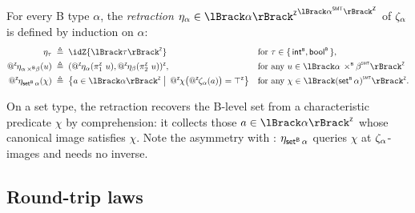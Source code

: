 \begin{definition}
  \label{def:beer-retraction}
  For every B type \(\alpha\), the \emph{retraction} \(\regnotation{\retr{\alpha}} \in {\interpZ{\alpha}}^{\interpZ{\toSMT{\alpha}}}\) of \(\zeta_{\alpha}\) is defined by induction on \(\alpha\):
  \begin{align*}
    \retr{\tau} &\;\triangleq\; \idZ{\interpZ{\tau}} && \text{for \(\tau \in \{\,\intB, \boolB\,\}\)}, \\
    \appZ\retr{\alpha \prodB \beta}(u) &\;\triangleq\; \pairZ{\appZ\retr{\alpha}(\fstZ u)}{\appZ\retr{\beta}(\sndZ u)}, && \text{for any \(u \in \interpZ{\toSMT{\alpha \prodB \beta}}\)} \\
    \appZ\retr{\setB \alpha}(\chi) &\;\triangleq\; \bigl\{ a \in \interpZ{\alpha} \;\big|\; \appZ \chi\bigl(\appZ\canon{\alpha}(a)\bigr) = \topZ \bigr\} && \text{for any \(\chi \in \interpZ{\toSMT{(\setB\alpha)}}\)}.
  \end{align*}
\end{definition}

On a set type, the retraction recovers the B-level set from a characteristic predicate \(\chi\) by comprehension: it collects those \(a \in \interpZ{\alpha}\) whose canonical image satisfies \(\chi\).
Note the asymmetry with : \(\eta_{\mathsf{set}^{\scriptscriptstyle{\mathsf{B}}}\,\alpha}\) queries \(\chi\) at \(\zeta_{\alpha}\)-images and needs no inverse.

\subsection{Round-trip laws}
\label{sec:beer-round-trip}

